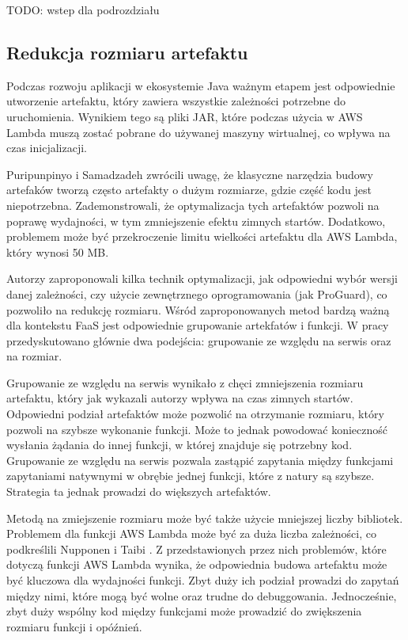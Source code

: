 TODO: wstep dla podrozdziału

\subsection*{Redukcja rozmiaru artefaktu}\label{chapter:przeglad_literatury_wyniki_redukcja_rozmiaru}

Podczas rozwoju aplikacji w ekosystemie Java ważnym etapem jest odpowiednie utworzenie artefaktu, który zawiera wszystkie zależności potrzebne do uruchomienia.
Wynikiem tego są pliki JAR, które podczas użycia w AWS Lambda muszą zostać pobrane do używanej maszyny wirtualnej, co wpływa na czas inicjalizacji.

Puripunpinyo i Samadzadeh \cite{8116416} zwrócili uwagę, że klasyczne narzędzia budowy artefaków tworzą często artefakty o dużym rozmiarze, gdzie część kodu jest niepotrzebna.
Zademonstrowali, że optymalizacja tych artefaktów pozwoli na poprawę wydajności, w tym zmniejszenie efektu zimnych startów. 
Dodatkowo, problemem może być przekroczenie limitu wielkości artefaktu dla AWS Lambda, który wynosi 50 MB.

Autorzy zaproponowali kilka technik optymalizacji, jak odpowiedni wybór wersji danej zależności, czy użycie zewnętrznego oprogramowania (jak ProGuard), co pozwoliło na redukcję rozmiaru.
Wśród zaproponowanych metod bardzą ważną dla kontekstu FaaS jest odpowiednie grupowanie artekfatów i funkcji. W pracy przedyskutowano głównie dwa podejścia: grupowanie ze względu na serwis oraz na rozmiar.

Grupowanie ze względu na serwis wynikało z chęci zmniejszenia rozmiaru artefaktu, który jak wykazali autorzy wpływa na czas zimnych startów. 
Odpowiedni podział artefaktów może pozwolić na otrzymanie rozmiaru, który pozwoli na szybsze wykonanie funkcji. Może to jednak powodować konieczność wysłania żądania do innej funkcji, w której znajduje się potrzebny kod.
Grupowanie ze względu na serwis pozwala zastąpić zapytania między funkcjami zapytaniami natywnymi w obrębie jednej funkcji, które z natury są szybsze. Strategia ta jednak prowadzi do większych artefaktów.

Metodą na zmiejszenie rozmiaru może być także użycie mniejszej liczby bibliotek. Problemem dla funkcji AWS Lambda może być za duża liczba zależności, co podkreślili Nupponen i Taibi \cite{9095731}.
Z przedstawionych przez nich problemów, które dotyczą funkcji AWS Lambda wynika, że odpowiednia budowa artefaktu może być kluczowa dla wydajności funkcji. 
Zbyt duży ich podział prowadzi do zapytań między nimi, które mogą być wolne oraz trudne do debuggowania. 
Jednocześnie, zbyt duży wspólny kod między funkcjami może prowadzić do zwiększenia rozmiaru funkcji i opóźnień. 

